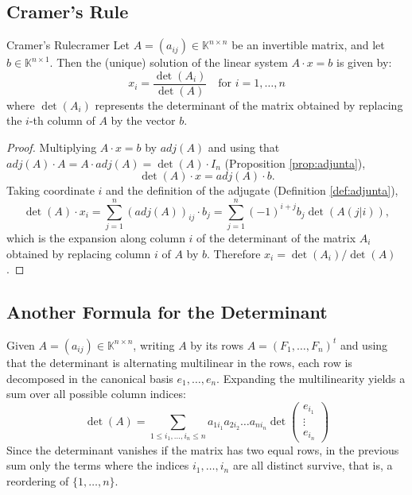 \documentclass[11pt, a4paper]{article}
\begin{document}
\subsection{Cramer's Rule}

\begin{proposicion}{Cramer's Rule}{cramer}
Let $A=(a_{ij}) \in \mathbb{K}^{n \times n}$ be an invertible matrix, and let $b \in \mathbb{K}^{n \times 1}$.
Then the (unique) solution of the linear system $A \cdot x = b$ is given by:
\[
x_i = \frac{\det(A_i)}{\det(A)} \quad \text{for } i=1, \dots, n
\]
where $\det(A_i)$ represents the determinant of the matrix obtained by replacing the $i$-th column of $A$ by the vector $b$.
\end{proposicion}

\begin{proof}
Multiplying $A \cdot x = b$ by $adj(A)$ and using that $adj(A) \cdot A = A \cdot adj(A) = \det(A) \cdot I_n$ (Proposition \ref{prop:adjunta}),
\[
\det(A) \cdot x = adj(A) \cdot b.
\]
Taking coordinate $i$ and the definition of the adjugate (Definition \ref{def:adjunta}),
\[
\det(A) \cdot x_i = \sum_{j=1}^{n} (adj(A))_{ij} \cdot b_j = \sum_{j=1}^{n} (-1)^{i+j} b_j \det(A(j|i)),
\]
which is the expansion along column $i$ of the determinant of the matrix $A_i$ obtained by replacing column $i$ of $A$ by $b$. Therefore $x_i = \det(A_i)/\det(A)$.
\end{proof}

\subsection{Another Formula for the Determinant}

Given $A=(a_{ij}) \in \mathbb{K}^{n \times n}$, writing $A$ by its rows $A = (F_1, \dots, F_n)^t$ and using that the determinant is alternating multilinear in the rows, each row is decomposed in the canonical basis $e_1, \dots, e_n$. Expanding the multilinearity yields a sum over all possible column indices:
\[
\det(A) = \sum_{1 \le i_1, \dots, i_n \le n} a_{1 i_1} a_{2 i_2} \dots a_{n i_n} \det \begin{pmatrix} e_{i_1} \\ \vdots \\ e_{i_n} \end{pmatrix}
\]
Since the determinant vanishes if the matrix has two equal rows, in the previous sum only the terms where the indices $i_1, \dots, i_n$ are all distinct survive, that is, a reordering of $\{1, \dots, n\}$.
\end{document}
